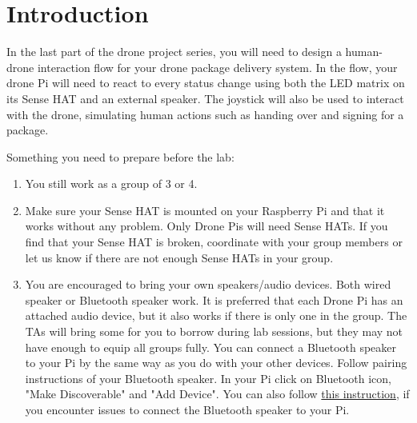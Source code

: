 \documentclass{article}
\begin{document}
\newpage


\section{Introduction}
In the last part of the drone project series, you will need to design a human-drone interaction flow for your drone package delivery system. In the flow, your drone Pi will need to react to every status change using both the LED matrix on its Sense HAT and an external speaker. The joystick will also be used to interact with the drone, simulating human actions such as handing over and signing for a package.

Something you need to prepare before the lab:
\begin{enumerate}
    \item You still work as a group of 3 or 4. 
    \item Make sure your Sense HAT is mounted on your Raspberry Pi and that it works without any problem. Only Drone Pis will need Sense HATs. If you find that your Sense HAT is broken, coordinate with your group members or let us know if there are not enough Sense HATs in your group.
    \item You are encouraged to bring your own speakers/audio devices. Both wired speaker or Bluetooth speaker work. It is preferred that each Drone Pi has an attached audio device, but it also works if there is only one in the group. The TAs will bring some for you to borrow during lab sessions, but they may not have enough to equip all groups fully. You can connect a Bluetooth speaker to your Pi by the same way as you do with your other devices. Follow pairing instructions of your Bluetooth speaker. In your Pi click on Bluetooth icon, "Make Discoverable" and "Add Device".
    You can also follow \textcolor{blue}{\href{https://raspberrydiy.com/connect-raspberry-pi-bluetooth-speaker/}{this instruction}}, if you encounter issues to connect the Bluetooth speaker to your Pi.  
\end{enumerate}
\end{document}
